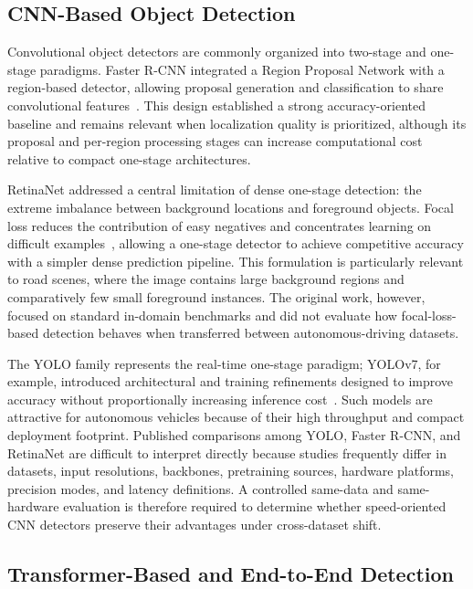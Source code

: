 \subsection{CNN-Based Object Detection}
\label{sec:related_cnn}

Convolutional object detectors are commonly organized into two-stage and one-stage
paradigms. Faster R-CNN integrated a Region Proposal Network with a region-based detector,
allowing proposal generation and classification to share convolutional
features~\cite{ren2015fasterrcnn}. This design established a strong accuracy-oriented
baseline and remains relevant when localization quality is prioritized, although its
proposal and per-region processing stages can increase computational cost relative to
compact one-stage architectures.

RetinaNet addressed a central limitation of dense one-stage detection: the extreme
imbalance between background locations and foreground objects. Focal loss reduces the
contribution of easy negatives and concentrates learning on difficult
examples~\cite{lin2017focalloss}, allowing a one-stage detector to achieve competitive
accuracy with a simpler dense prediction pipeline. This formulation is particularly
relevant to road scenes, where the image contains large background regions and
comparatively few small foreground instances. The original work, however, focused on
standard in-domain benchmarks and did not evaluate how focal-loss-based detection behaves
when transferred between autonomous-driving datasets.

The YOLO family represents the real-time one-stage paradigm; YOLOv7, for example,
introduced architectural and training refinements designed to improve accuracy without
proportionally increasing inference cost~\cite{wang2023yolov7}. Such models are
attractive for autonomous vehicles because of their high throughput and compact
deployment footprint. Published comparisons among YOLO, Faster R-CNN, and RetinaNet are
difficult to interpret directly because studies frequently differ in datasets, input
resolutions, backbones, pretraining sources, hardware platforms, precision modes, and
latency definitions. A controlled same-data and same-hardware evaluation is therefore
required to determine whether speed-oriented CNN detectors preserve their advantages
under cross-dataset shift.

\subsection{Transformer-Based and End-to-End Detection}
\label{sec:related_transformer}


